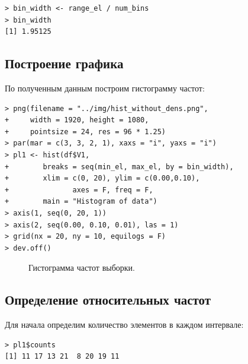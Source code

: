 \documentclass[14pt,a4paper]{scrartcl}
\begin{document}
\begin{lstlisting}
> bin_width <- range_el / num_bins
> bin_width
[1] 1.95125
\end{lstlisting}


\subsection{Построение графика}
По полученным данным построим гистограмму частот:


\begin{lstlisting}
> png(filename = "../img/hist_without_dens.png", 
+     width = 1920, height = 1080,
+     pointsize = 24, res = 96 * 1.25)
> par(mar = c(3, 3, 2, 1), xaxs = "i", yaxs = "i")
> pl1 <- hist(df$V1,
+        breaks = seq(min_el, max_el, by = bin_width), 
+        xlim = c(0, 20), ylim = c(0.00,0.10), 
+				axes = F, freq = F,
+        main = "Histogram of data")
> axis(1, seq(0, 20, 1))
> axis(2, seq(0.00, 0.10, 0.01), las = 1)
> grid(nx = 20, ny = 10, equilogs = F)
> dev.off()
\end{lstlisting}

\begin{figure}[t!]
	\caption{Гистограмма частот выборки.}
	\label{ris:hist_without_dens}
\end{figure}

\subsection{Определение относительных частот}
Для начала определим количество элементов в каждом интервале:
\begin{lstlisting}
> pl1$counts
[1] 11 17 13 21  8 20 19 11
\end{lstlisting}
\end{document}
